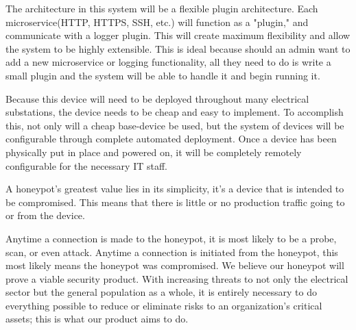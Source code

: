 The architecture in this system will be a flexible plugin architecture. Each microservice(HTTP, HTTPS, SSH, etc.) will function as a "plugin," and communicate with a logger plugin. This will create maximum flexibility and allow the system to be highly extensible. This is ideal because should an admin want to add a new microservice or logging functionality, all they need to do is write a small plugin and the system will be able to handle it and begin running it.

Because this device will need to be deployed throughout many electrical substations, the device needs to be cheap and easy to implement. To accomplish this, not only will a cheap base-device be used, but the system of devices will be configurable through complete automated deployment. Once a device has been physically put in place and powered on, it will be completely remotely configurable for the necessary IT staff.

A honeypot's greatest value lies in its simplicity, it's a device that is intended to be compromised. This means that there is little or no production traffic going to or from the device. 

Anytime a connection is made to the honeypot, it is most likely to be a probe, scan, or even attack. Anytime a connection is initiated from the honeypot, this most likely means the honeypot was compromised. We believe our honeypot will prove a viable security product. With increasing threats to not only the electrical sector but the general population as a whole, it is entirely necessary to do everything possible to reduce or eliminate risks to an organization's critical assets; this is what our product aims to do.
